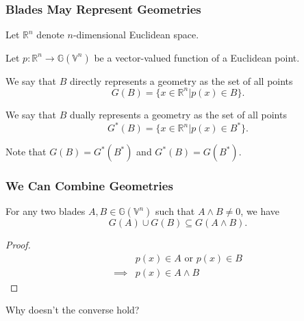\documentclass{beamer}
\newcommand{\G}{\mathbb{G}}
\newcommand{\V}{\mathbb{V}}
\newcommand{\R}{\mathbb{R}}
\begin{document}
\begin{frame}
\frametitle{Blades May Represent Geometries}
Let $\R^n$ denote $n$-dimensional Euclidean space.\pause

Let $p:\R^n\to\G(\V^n)$ be a vector-valued function of a Euclidean point.\pause
\begin{definition}
We say that $B$ \alert{directly} represents a geometry as the
set of all points
\begin{equation*}
G(B) = \{x\in\R^n|p(x)\in B\}.
\end{equation*}
\end{definition}\pause
\begin{definition}
We say that $B$ \alert{dually} represents a geometry as the
set of all points
\begin{equation*}
G^*(B) = \{x\in\R^n|p(x)\in B^*\}.
\end{equation*}
\end{definition}\pause
Note that $G(B)=G^*(B^*)$ and $G^*(B)=G(B^*)$.
\end{frame}

\begin{frame}
\frametitle{We Can Combine Geometries}
For any two blades $A,B\in\G(\V^n)$ such that $A\wedge B\neq 0$, we have
\begin{equation*}
G(A)\cup G(B)\subseteq G(A\wedge B).
\end{equation*}\pause
\begin{proof}
\begin{align*}
 & \mbox{$p(x)\in A$ or $p(x)\in B$} \\
\implies & \mbox{$p(x)\in A\wedge B$}
\end{align*}
\end{proof}\pause
Why doesn't the converse hold?
\end{frame}
\end{document}
